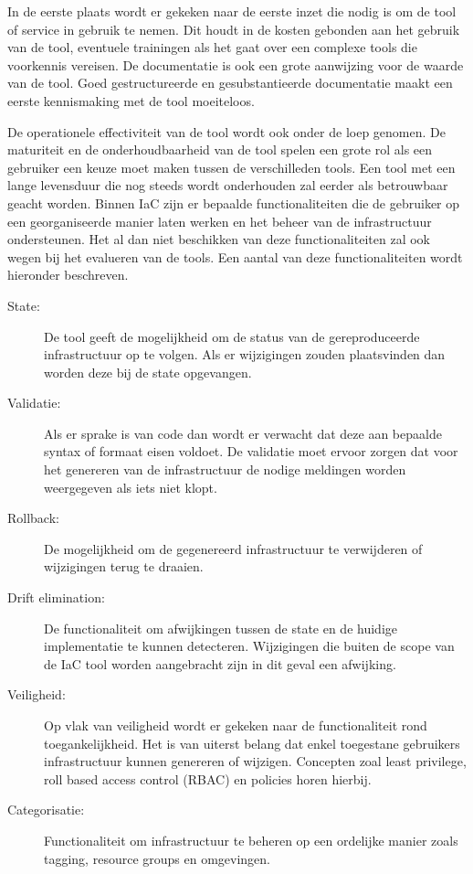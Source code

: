 In de eerste plaats wordt er gekeken naar de eerste inzet die nodig is om de tool of service in gebruik te nemen.
Dit houdt in de kosten gebonden aan het gebruik van de tool, eventuele trainingen als het gaat over een complexe tools die voorkennis vereisen.
De documentatie is ook een grote aanwijzing voor de waarde van de tool.
Goed gestructureerde en gesubstantieerde documentatie maakt een eerste kennismaking met de tool moeiteloos.

De operationele effectiviteit van de tool wordt ook onder de loep genomen.
De maturiteit en de onderhoudbaarheid van de tool spelen een grote rol als een gebruiker een keuze moet maken tussen de verschilleden tools.
Een tool met een lange levensduur die nog steeds wordt onderhouden zal eerder als betrouwbaar geacht worden.
Binnen IaC zijn er bepaalde functionaliteiten die de gebruiker op een georganiseerde manier laten werken en het beheer van de infrastructuur ondersteunen.
Het al dan niet beschikken van deze functionaliteiten zal ook wegen bij het evalueren van de tools.
Een aantal van deze functionaliteiten wordt hieronder beschreven.

\begin{description}
    \item[State:] De tool geeft de mogelijkheid om de status van de gereproduceerde infrastructuur op te volgen. Als er wijzigingen zouden plaatsvinden dan worden deze bij de state opgevangen.
    \item[Validatie:] Als er sprake is van code dan wordt er verwacht dat deze aan bepaalde syntax of formaat eisen voldoet. De validatie moet ervoor zorgen dat voor het genereren van de infrastructuur de nodige meldingen worden weergegeven als iets niet klopt.
    \item[Rollback:] De mogelijkheid om de gegenereerd infrastructuur te verwijderen of wijzigingen terug te draaien.
    \item[Drift elimination:] De functionaliteit om afwijkingen tussen de state en de huidige implementatie te kunnen detecteren. Wijzigingen die buiten de scope van de IaC tool worden aangebracht zijn in dit geval een afwijking.
    \item[Veiligheid:] Op vlak van veiligheid wordt er gekeken naar de functionaliteit rond toegankelijkheid. Het is van uiterst belang dat enkel toegestane gebruikers infrastructuur kunnen genereren of wijzigen. Concepten zoal least privilege, roll based access control (RBAC) en policies horen hierbij.
    \item[Categorisatie:] Functionaliteit om infrastructuur te beheren op een ordelijke manier zoals tagging, resource groups en omgevingen.
\end{description}

